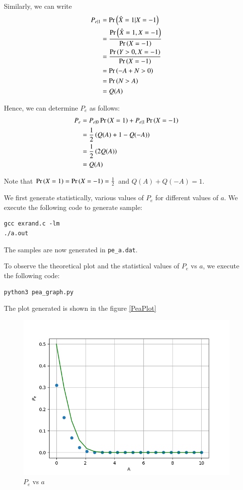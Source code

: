 \documentclass[journal,12pt,twocolumn]{IEEEtran}
\renewcommand\thesection{\arabic{section}}
\begin{document}
\begin{enumerate}[label=\thesection.\arabic*
,ref=\thesection.\theenumi]
	Similarly, we can write
	\begin{align}
		P_{e|1} &= \Pr\left(\hat{X} = 1|X = -1\right) \\
		&= \frac{\Pr\left(\hat{X} = 1, X = -1\right)}{\Pr\left(X = -1\right)} \\
		&= \frac{\Pr\left(Y > 0, X = -1\right)}{\Pr\left(X = -1\right)} \\
		&= \Pr\left(-A + N > 0\right) \\
		&= \Pr\left(N > A\right) \\
		&= Q(A)
		\label{eq:PE1}
	\end{align}
	
	Hence, we can determine $P_e$ as follows:
	\begin{align}
		P_e &= P_{e|0} \Pr\left(X = 1\right) + P_{e|1} \Pr\left(X = -1\right) \\
		&= \frac{1}{2}\left( Q(A) + 1 - Q(-A) \right) \\
		&= \frac{1}{2}\left( 2Q(A) \right) \\
		&= Q(A)
		\label{eq:PE}
	\end{align}

	Note that $\Pr\left(X = 1\right) = \Pr\left(X = -1\right) = \frac{1}{2}$ and $Q(A) + Q(-A) = 1$.
	
	We first generate statistically, various values of $P_e$ for different values of $a$. We execute the following code to generate sample:
	\begin{lstlisting}
gcc exrand.c -lm
./a.out
	\end{lstlisting}
	The samples are now generated in \verb|pe_a.dat|.
	
	To observe the theoretical plot and the statistical values of $P_e$ vs $a$, we execute the following code:
	\begin{lstlisting}
python3 pea_graph.py
	\end{lstlisting}

	The plot generated is shown in the figure \eqref{PeaPlot}
	\begin{figure}
	\centering
	\includegraphics[width=\columnwidth]{../figs/pea_plot.png}
	\caption{$P_e$ vs $a$}
	\label{fig:PeaPlot}
	\end{figure}



\end{enumerate}
\end{document}
